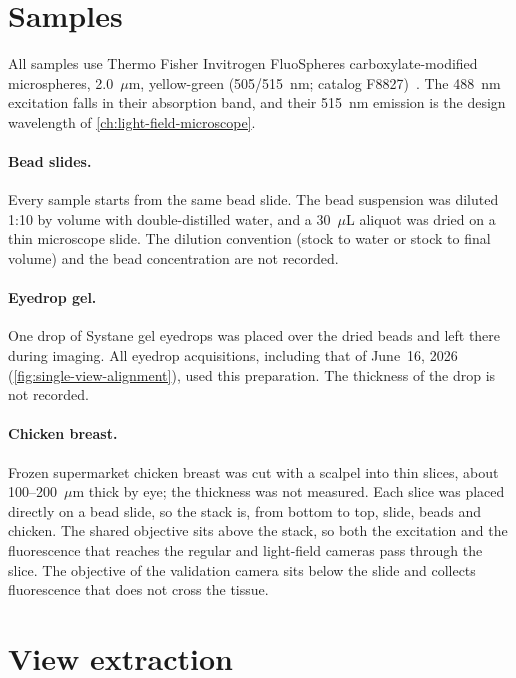\section{Samples}
\label{sec:app-samples}

All samples use Thermo Fisher Invitrogen FluoSpheres carboxylate-modified microspheres, 2.0~$\mu$m, yellow-green (505/515~nm; catalog F8827)~\cite{thermofisher2026fluospheresYellowGreen}. The 488~nm excitation falls in their absorption band, and their 515~nm emission is the design wavelength of \cref{ch:light-field-microscope}.

\paragraph{Bead slides.} Every sample starts from the same bead slide. The bead suspension was diluted 1:10 by volume with double-distilled water, and a 30~$\mu$L aliquot was dried on a thin microscope slide. The dilution convention (stock to water or stock to final volume) and the bead concentration are not recorded.

\paragraph{Eyedrop gel.} One drop of Systane gel eyedrops was placed over the dried beads and left there during imaging. All eyedrop acquisitions, including that of June~16, 2026 (\cref{fig:single-view-alignment}), used this preparation. The thickness of the drop is not recorded.

\paragraph{Chicken breast.} Frozen supermarket chicken breast was cut with a scalpel into thin slices, about 100--200~$\mu$m thick by eye; the thickness was not measured. Each slice was placed directly on a bead slide, so the stack is, from bottom to top, slide, beads and chicken. The shared objective sits above the stack, so both the excitation and the fluorescence that reaches the regular and light-field cameras pass through the slice. The objective of the validation camera sits below the slide and collects fluorescence that does not cross the tissue.

\section{View extraction}
\label{sec:app-view-extraction}

